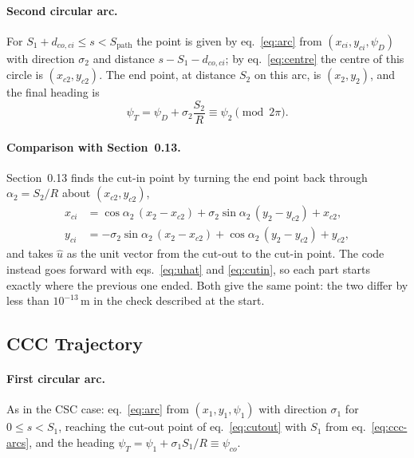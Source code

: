 \documentclass[10pt]{article}
\newcommand{\Spath}{S_{\mathrm{path}}}
\newcommand{\dcoci}{d_{co,ci}}
\begin{document}
\paragraph{Second circular arc.} For $S_1 + \dcoci \le s < \Spath$ the point is given by eq.~\eqref{eq:arc} from
$(x_{ci}, y_{ci}, \psi_D)$ with direction $\sigma_2$ and distance $s - S_1 - \dcoci$; by eq.~\eqref{eq:centre} the
centre of this circle is $(x_{c2}, y_{c2})$. The end point, at distance $S_2$ on this arc, is $(x_2, y_2)$, and the
final heading is
\begin{equation}
  \psi_T = \psi_D + \sigma_2 \frac{S_2}{R} \equiv \psi_2 \pmod{2\pi}.
  \label{eq:csc-end}
\end{equation}

\paragraph{Comparison with Section~0.13.} Section~0.13 finds the cut-in point by turning the end point back through
$\alpha_2 = S_2 / R$ about $(x_{c2}, y_{c2})$,
\begin{equation}
  \begin{aligned}
  x_{ci} &= \cos\alpha_2\,(x_2 - x_{c2}) + \sigma_2 \sin\alpha_2\,(y_2 - y_{c2}) + x_{c2},\\
  y_{ci} &= -\sigma_2 \sin\alpha_2\,(x_2 - x_{c2}) + \cos\alpha_2\,(y_2 - y_{c2}) + y_{c2},
  \end{aligned}
  \label{eq:cutin-back}
\end{equation}
and takes $\hat{u}$ as the unit vector from the cut-out to the cut-in point. The code instead goes forward with
eqs.~\eqref{eq:uhat} and \eqref{eq:cutin}, so each part starts exactly where the previous one ended. Both give the
same point: the two differ by less than $10^{-13}$\,m in the check described at the start.

\subsection{CCC Trajectory}

\paragraph{First circular arc.} As in the CSC case: eq.~\eqref{eq:arc} from $(x_1, y_1, \psi_1)$ with direction
$\sigma_1$ for $0 \le s < S_1$, reaching the cut-out point of eq.~\eqref{eq:cutout} with $S_1$ from
eq.~\eqref{eq:ccc-arcs}, and the heading $\psi_T = \psi_1 + \sigma_1 S_1 / R \equiv \psi_{co}$.
\end{document}
